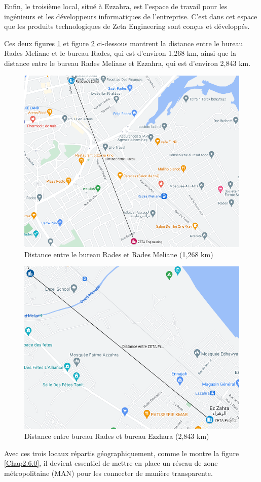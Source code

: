 Enfin, le troisième local, situé à Ezzahra, est l'espace de travail pour les ingénieurs et les développeurs informatiques de l'entreprise. C'est dans cet espace que les produits technologiques de Zeta Engineering sont conçus et développés.

Ces deux figures \ref{Chap2.4.21} et figure \ref{Chap2.5.5} ci-dessous montrent la distance entre le bureau Rades Meliane et le bureau Rades, qui est d'environ 1,268 km, ainsi que la distance entre le bureau Rades Meliane et Ezzahra, qui est d'environ 2,843 km.

\begin{figure}[H]
\centering
\includegraphics[width=16cm]{Images/distance1.png}
\caption{Distance entre le bureau Rades et Rades Meliane (1,268 km)}
\label{Chap2.4.21}
\end{figure}


\begin{figure}[H]
 \centering
    \includegraphics[width=16cm]{Images/Distance2.png}
    \caption{Distance entre bureau Rades et bureau Ezzhara (2,843 km)}
    \label{Chap2.5.5}
\end{figure}    
\newpage
Avec ces trois locaux répartis géographiquement, comme le montre la figure \ref{Chap2.6.0}, il devient essentiel de mettre en place un réseau de zone métropolitaine (MAN) pour les connecter de manière transparente. 

